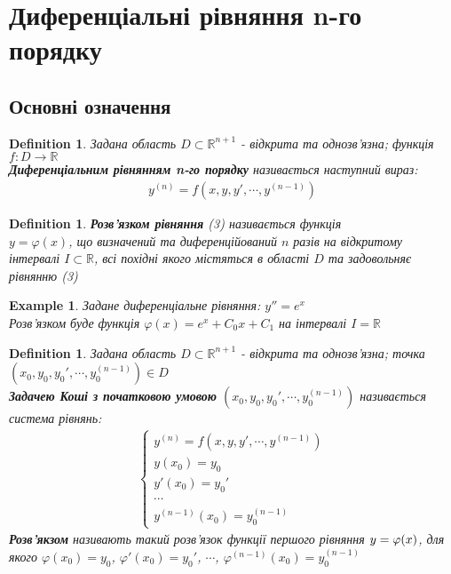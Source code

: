 \documentclass[a4paper, 10pt]{article}
\theoremstyle{theoremdd}
\theoremstyle{theoremdd}
\newtheorem{definition}[theorem]{Definition}
\theoremstyle{theoremdd}
\theoremstyle{theoremdd}
\newtheorem{example}[theorem]{Example}
\theoremstyle{theoremdd}
\theoremstyle{theoremdd}
\theoremstyle{theoremdd}
\theoremstyle{theoremdd}
\begin{document}
	
	\section{Диференціальні рівняння n-го порядку}
	\subsection{Основні означення}
	\begin{definition}
 Задана область $D \subset \mathbb{R}^{n+1}$ - відкрита та однозв'язна; функція $f: D \rightarrow \mathbb{R}$\\
	\textbf{Диференціальним рівнянням n-го порядку} називається наступний вираз:
	\begin{align}
	y^{(n)} = f(x,y,y',\cdots,y^{(n-1)})
	\end{align}
	\end{definition}

	\begin{definition}
 \textbf{Розв'язком рівняння} (3) називається функція \\ $y= \varphi(x)$, що визначений та диференційований $n$ разів на відкритому інтервалі $I \subset \mathbb{R}$, всі похідні якого містяться в області $D$ та задовольняє рівнянню (3)
 	\end{definition}
 	
	\begin{example}
 Задане диференціальне рівняння: $y'' = e^x$\\
	Розв'язком буде функція $\varphi(x) = e^x + C_0x + C_1$ на інтервалі $I = \mathbb{R}$
	\end{example}
	
	\begin{definition}
 Задана область $D \subset \mathbb{R}^{n+1}$ - відкрита та однозв'язна; точка $(x_0, y_0, y_0', \cdots, y_0^{(n-1)}) \in D$\\
	\textbf{Задачею Коші з початковою умовою} $(x_0, y_0, y_0', \cdots, y_0^{(n-1)})$ називається система рівнянь:
	\begin{align*}
	\begin{cases}
	\displaystyle y^{(n)} = f(x,y,y',\cdots,y^{(n-1)})\\
	y(x_0)=y_0\\
	y'(x_0) = y_0'\\
	\cdots\\
	y^{(n-1)}(x_0) = y_0^{(n-1)}
	\end{cases}
	\end{align*}
	\textbf{Розв'якзом} називають такий розв'язок функції першого рівняння $\\y=\varphi(x)$, для якого $\varphi(x_0)=y_0$, $\varphi'(x_0)=y_0'$, $\cdots$, $\varphi^{(n-1)}(x_0)=y_0^{(n-1)}$
	\end{definition}
	
\end{document}
